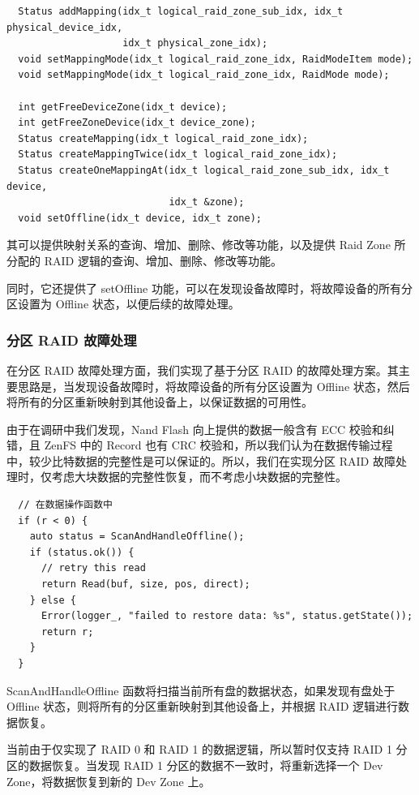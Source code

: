 \begin{lstlisting}
  Status addMapping(idx_t logical_raid_zone_sub_idx, idx_t physical_device_idx,
                    idx_t physical_zone_idx);
  void setMappingMode(idx_t logical_raid_zone_idx, RaidModeItem mode);
  void setMappingMode(idx_t logical_raid_zone_idx, RaidMode mode);

  int getFreeDeviceZone(idx_t device);
  int getFreeZoneDevice(idx_t device_zone);
  Status createMapping(idx_t logical_raid_zone_idx);
  Status createMappingTwice(idx_t logical_raid_zone_idx);
  Status createOneMappingAt(idx_t logical_raid_zone_sub_idx, idx_t device,
                            idx_t &zone);
  void setOffline(idx_t device, idx_t zone);
\end{lstlisting}

其可以提供映射关系的查询、增加、删除、修改等功能，以及提供 Raid Zone 所分配的 RAID 逻辑的查询、增加、删除、修改等功能。

同时，它还提供了 setOffline 功能，可以在发现设备故障时，将故障设备的所有分区设置为 Offline 状态，以便后续的故障处理。

\subsubsection{分区 RAID 故障处理}

在分区 RAID 故障处理方面，我们实现了基于分区 RAID 的故障处理方案。其主要思路是，当发现设备故障时，将故障设备的所有分区设置为 Offline 状态，然后将所有的分区重新映射到其他设备上，以保证数据的可用性。

由于在调研中我们发现，Nand Flash 向上提供的数据一般含有 ECC 校验和纠错，且 ZenFS 中的 Record 也有 CRC 校验和，所以我们认为在数据传输过程中，较少比特数据的完整性是可以保证的。所以，我们在实现分区 RAID 故障处理时，仅考虑大块数据的完整性恢复，而不考虑小块数据的完整性。

\begin{lstlisting}
  // 在数据操作函数中
  if (r < 0) {
    auto status = ScanAndHandleOffline();
    if (status.ok()) {
      // retry this read
      return Read(buf, size, pos, direct);
    } else {
      Error(logger_, "failed to restore data: %s", status.getState());
      return r;
    }
  }
\end{lstlisting}

ScanAndHandleOffline 函数将扫描当前所有盘的数据状态，如果发现有盘处于 Offline 状态，则将所有的分区重新映射到其他设备上，并根据 RAID 逻辑进行数据恢复。

当前由于仅实现了 RAID 0 和 RAID 1 的数据逻辑，所以暂时仅支持 RAID 1 分区的数据恢复。当发现 RAID 1 分区的数据不一致时，将重新选择一个 Dev Zone，将数据恢复到新的 Dev Zone 上。

